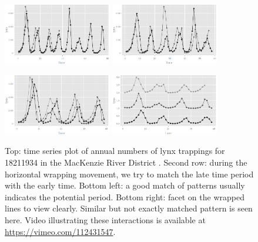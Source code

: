 \documentclass[12pt]{article}
\begin{document}
\begin{itemize}
\begin{center}
\begin{figure}[H]
\begin{centering}
\includegraphics[width=0.42\textwidth]{graph/pipeline-16-1} \includegraphics[width=0.42\textwidth]{graph/pipeline-16-2}
\par\end{centering}

\begin{centering}
\includegraphics[width=0.42\textwidth]{graph/pipeline-16-xwrap} \includegraphics[width=0.42\textwidth]{graph/pipeline-16-xwrap-facet}
\par\end{centering}

\caption{\label{fig:x-wrapping}Top: time series plot of annual numbers of
lynx trappings for 1821\textendash{}1934 in the MacKenzie River District
\citep{campbell1977survey}. Second row: during the horizontal wrapping
movement, we try to match the late time period with the early time.
Bottom left: a good match of patterns usually indicates the potential
period. Bottom right: facet on the wrapped lines to view clearly.
Similar but not exactly matched pattern is seen here. Video illustrating these interactions is available at \url{https://vimeo.com/112431547}.}
\end{figure}


\end{center}
\end{itemize}
\end{document}
